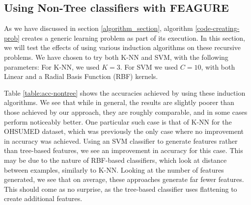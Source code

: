 \documentclass[twoside,11pt]{article}
\theoremstyle{definition}
\begin{document}
\subsection{Using Non-Tree classifiers with FEAGURE}

As we have discussed in section \ref{algorithm_section}, algorithm \ref{code-creating-prob} creates a generic learning problem as part of its execution. In this section, we will test the effects of using various induction algorithms on these recursive problems. We have chosen to try both K-NN and SVM, with the following parameters: For K-NN, we used $K=3$. For SVM we used $C=10$, with both Linear and a Radial Basis Function (RBF) kernels.

Table \ref{table:acc-nontree} shows the accuracies achieved by using these induction algorithms. We see that while in general, the results are slightly poorer than those achieved by our approach, they are roughly comparable, and in some cases perform noticeably better. One particular such case is that of K-NN for the OHSUMED dataset, which was previously the only case where no improvement in accuracy was achieved. Using an SVM classifier to generate features rather than tree-based features, we see an improvement in accuracy for this case. This may be due to the nature of RBF-based classifiers, which look at distance between examples, similarly to K-NN.
Looking at the number of features generated, we see that on average, these approaches generate far fewer features. This should come as no surprise, as the tree-based classifier uses flattening to create additional features.
\end{document}
